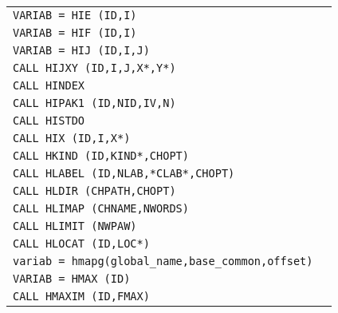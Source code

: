 \begin{longtable}{|>{\tt}p{.9\linewidth}r|}
VARIAB = HIE    (ID,I)                       
&                                                       \pageref{HIE}    \\
VARIAB = HIF    (ID,I)                       
&                                                       \pageref{HIF}    \\
VARIAB = HIJ    (ID,I,J)                     
&                                                       \pageref{HIJ}    \\
CALL     HIJXY  (ID,I,J,X*,Y*)               
&                                                       \pageref{HIJXY}  \\
CALL     HINDEX                              
&                                                       \pageref{HINDEX} \\
CALL     HIPAK1 (ID,NID,IV,N)                
&                                                       \pageref{HIPAK1} \\
CALL     HISTDO                              
&                                                       \pageref{HISTDO} \\
CALL     HIX    (ID,I,X*)                    
&                                                       \pageref{HIX}    \\
CALL     HKIND  (ID,KIND*,CHOPT)
&                                                       \pageref{HKIND}  \\
CALL     HLABEL (ID,NLAB,*CLAB*,CHOPT)
&                                                       \pageref{HLABEL} \\
CALL     HLDIR  (CHPATH,CHOPT)               
&                                                       \pageref{HLDIR}  \\
CALL     HLIMAP (CHNAME,NWORDS)
&                                                       \pageref{HLIMAP} \\
CALL     HLIMIT (NWPAW)                      
&                                                       \pageref{HLIMIT} \\
CALL     HLOCAT (ID,LOC*)                    
&                                                       \pageref{HLOCAT} \\
variab = hmapg(global\_name,base\_common,offset)
&                                                        \pageref{hmapg} \\
VARIAB = HMAX   (ID)                         
&                                                       \pageref{HMAX}   \\
CALL     HMAXIM (ID,FMAX)                    

\end{longtable}
